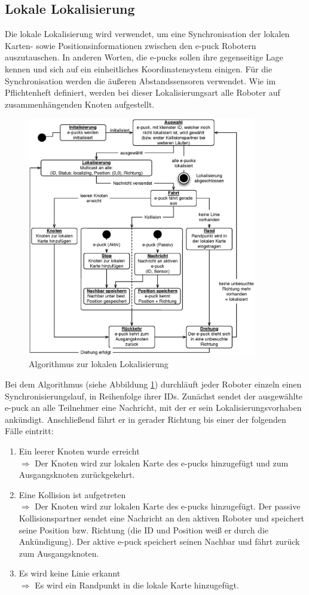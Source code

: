 \documentclass[10pt,a4paper]{article}
\begin{document}
		\subsection{Lokale Lokalisierung}
			Die lokale Lokalisierung wird verwendet, um eine Synchronisation der lokalen Karten- sowie Positionsinformationen zwischen den
			e-puck Robotern auszutauschen. In anderen Worten, die e-pucks sollen ihre gegenseitige Lage kennen und sich auf ein einheitliches
			Koordinatensystem einigen. Für die Synchronisation werden die äußeren Abstandssensoren verwendet. Wie im Pflichtenheft definiert,
			werden bei dieser Lokalisierungsart alle Roboter auf zusammenhängenden Knoten aufgestellt.
			 \begin{figure}[h]
				\centering
				\includegraphics[width=10cm]{images/lokale_lokalisierung.eps}
  				\caption{Algorithmus zur lokalen Lokalisierung}
  				\label{fig:lokale_lokalisierung}
  			\end{figure}
			Bei dem Algorithmus (siehe Abbildung \ref{fig:lokale_lokalisierung}) durchläuft jeder Roboter einzeln einen Synchronisierungslauf, in Reihenfolge ihrer IDs.
			Zunächst sendet der ausgewählte e-puck an alle Teilnehmer eine Nachricht, mit der er sein Lokalisierungsvorhaben ankündigt.
			Anschließend fährt er in gerader Richtung bis einer der folgenden Fälle eintritt:
			\begin{enumerate}
				\item Ein leerer Knoten wurde erreicht \\
				$\Longrightarrow$ Der Knoten wird zur lokalen Karte des e-pucks hinzugefügt und zum Ausgangsknoten zurückgekehrt.
				\item Eine Kollision ist aufgetreten \\
				$\Longrightarrow$ Der Knoten wird zur lokalen Karte des e-pucks hinzugefügt. Der passive Kollisionspartner sendet eine
				Nachricht an den aktiven Roboter und speichert seine Position bzw. Richtung  (die ID und Position weiß er durch die Ankündigung).
				Der aktive e-puck speichert seinen Nachbar und fährt zurück zum Ausgangsknoten.
				\item Es wird keine Linie erkannt \\
				$\Longrightarrow$ Es wird ein Randpunkt in die lokale Karte hinzugefügt.
			\end{enumerate}
\end{document}
